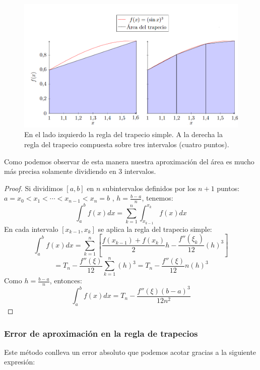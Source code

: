 \documentclass[12pt]{article}
\begin{document}
\begin{figure}[H]
    \centering
    \begin{adjustbox}{width=1\linewidth,center}
        \includegraphics{fotos/trapecios.png}
    \end{adjustbox}
    \caption{En el lado izquierdo la regla del trapecio simple. A la derecha la regla del trapecio compuesta sobre tres intervalos (cuatro puntos).}
    \label{trap}
\end{figure}

Como podemos observar de esta manera nuestra aproximación del área es mucho más precisa solamente dividiendo en 3 intervalos.

\newpage
\begin{proof}

Si dividimos $[a,b]$ en $n$ subintervalos definidos por los $n + 1$ puntos:
$a =x_0 <x_1 <\cdots < x_{n-1} < x_n = b$ , $h = \frac{b-a}{n}$, tenemos:
\[
\int_{a}^{b} f (x)dx = \sum_{k=1}^{n} \int_{x_{k-1}}^{x_k} f (x)dx
\]
En cada intervalo $[x_{k-1},x_k]$ se aplica la regla del trapecio simple:
\[
\int_{a}^{b} f (x)dx = \sum_{k=1}^{n} \left[\frac{f (x_{k-1}) + f (x_k)}{2}h - \frac{f''(\xi_k)}{12} (h)^3\right]
\]
\[
= T_n - \frac{f''(\xi)}{12} \sum_{k=1}^{n} (h)^3 = T_n - \frac{f''(\xi)}{12} n(h)^3
\]
Como $h = \frac{b-a}{n}$, entonces:
\[
\int_{a}^{b} f (x)dx = T_n - \frac{f''(\xi)(b -a)^3}{12n^2}
\]
\end{proof}


\subsubsection{Error de aproximación en la regla de trapecios}

Este método conlleva un error absoluto que podemos acotar gracias a la siguiente expresión:
\end{document}
